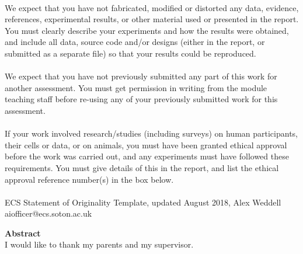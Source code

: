 \documentclass{article}
\begin{document}
\\[0.5cm]

We expect that you have not fabricated, modified or distorted any data, evidence, references,
experimental results, or other material used or presented in the report. You must clearly describe
your experiments and how the results were obtained, and include all data, source code and/or
designs (either in the report, or submitted as a separate file) so that your results could be
reproduced.\\

\\[0.5cm]

We expect that you have not previously submitted any part of this work for another assessment.
You must get permission in writing from the module teaching staff before re-using any of your
previously submitted work for this assessment.\\

\\[0.5cm]

If your work involved research/studies (including surveys) on human participants, their cells or
data, or on animals, you must have been granted ethical approval before the work was carried
out, and any experiments must have followed these requirements. You must give details of this in
the report, and list the ethical approval reference number(s) in the box below.\\

\\[0.5cm]


ECS Statement of Originality Template, updated August 2018, Alex Weddell aiofficer@ecs.soton.ac.uk\\


\newpage 

{\Huge \textbf{Abstract}}\\[1cm]


I would like to thank my parents and my supervisor. 
\end{document}
